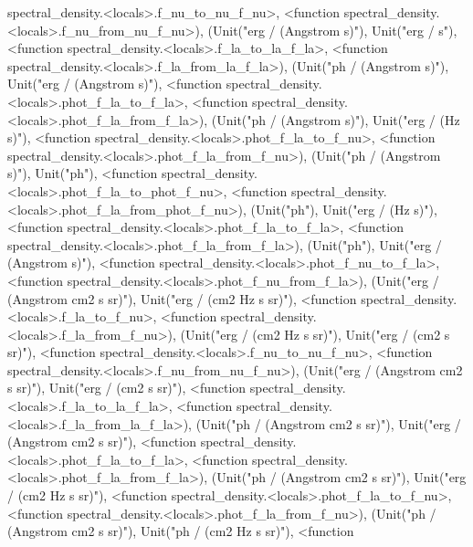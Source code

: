 \documentclass[letterpaper,10pt,english]{sphinxmanual}
\begin{document}
\begin{fulllineitems}
spectral\_density.\textless{}locals\textgreater{}.f\_nu\_to\_nu\_f\_nu\textgreater{}, \textless{}function spectral\_density.\textless{}locals\textgreater{}.f\_nu\_from\_nu\_f\_nu\textgreater{}), (Unit("erg / (Angstrom s)"), Unit("erg / s"), \textless{}function spectral\_density.\textless{}locals\textgreater{}.f\_la\_to\_la\_f\_la\textgreater{}, \textless{}function spectral\_density.\textless{}locals\textgreater{}.f\_la\_from\_la\_f\_la\textgreater{}), (Unit("ph / (Angstrom s)"), Unit("erg / (Angstrom s)"), \textless{}function spectral\_density.\textless{}locals\textgreater{}.phot\_f\_la\_to\_f\_la\textgreater{}, \textless{}function spectral\_density.\textless{}locals\textgreater{}.phot\_f\_la\_from\_f\_la\textgreater{}), (Unit("ph / (Angstrom s)"), Unit("erg / (Hz s)"), \textless{}function spectral\_density.\textless{}locals\textgreater{}.phot\_f\_la\_to\_f\_nu\textgreater{}, \textless{}function spectral\_density.\textless{}locals\textgreater{}.phot\_f\_la\_from\_f\_nu\textgreater{}), (Unit("ph / (Angstrom s)"), Unit("ph"), \textless{}function spectral\_density.\textless{}locals\textgreater{}.phot\_f\_la\_to\_phot\_f\_nu\textgreater{}, \textless{}function spectral\_density.\textless{}locals\textgreater{}.phot\_f\_la\_from\_phot\_f\_nu\textgreater{}), (Unit("ph"), Unit("erg / (Hz s)"), \textless{}function spectral\_density.\textless{}locals\textgreater{}.phot\_f\_la\_to\_f\_la\textgreater{}, \textless{}function spectral\_density.\textless{}locals\textgreater{}.phot\_f\_la\_from\_f\_la\textgreater{}), (Unit("ph"), Unit("erg / (Angstrom s)"), \textless{}function spectral\_density.\textless{}locals\textgreater{}.phot\_f\_nu\_to\_f\_la\textgreater{}, \textless{}function spectral\_density.\textless{}locals\textgreater{}.phot\_f\_nu\_from\_f\_la\textgreater{}), (Unit("erg / (Angstrom cm2 s sr)"), Unit("erg / (cm2 Hz s sr)"), \textless{}function spectral\_density.\textless{}locals\textgreater{}.f\_la\_to\_f\_nu\textgreater{}, \textless{}function spectral\_density.\textless{}locals\textgreater{}.f\_la\_from\_f\_nu\textgreater{}), (Unit("erg / (cm2 Hz s sr)"), Unit("erg / (cm2 s sr)"), \textless{}function spectral\_density.\textless{}locals\textgreater{}.f\_nu\_to\_nu\_f\_nu\textgreater{}, \textless{}function spectral\_density.\textless{}locals\textgreater{}.f\_nu\_from\_nu\_f\_nu\textgreater{}), (Unit("erg / (Angstrom cm2 s sr)"), Unit("erg / (cm2 s sr)"), \textless{}function spectral\_density.\textless{}locals\textgreater{}.f\_la\_to\_la\_f\_la\textgreater{}, \textless{}function spectral\_density.\textless{}locals\textgreater{}.f\_la\_from\_la\_f\_la\textgreater{}), (Unit("ph / (Angstrom cm2 s sr)"), Unit("erg / (Angstrom cm2 s sr)"), \textless{}function spectral\_density.\textless{}locals\textgreater{}.phot\_f\_la\_to\_f\_la\textgreater{}, \textless{}function spectral\_density.\textless{}locals\textgreater{}.phot\_f\_la\_from\_f\_la\textgreater{}), (Unit("ph / (Angstrom cm2 s sr)"), Unit("erg / (cm2 Hz s sr)"), \textless{}function spectral\_density.\textless{}locals\textgreater{}.phot\_f\_la\_to\_f\_nu\textgreater{}, \textless{}function spectral\_density.\textless{}locals\textgreater{}.phot\_f\_la\_from\_f\_nu\textgreater{}), (Unit("ph / (Angstrom cm2 s sr)"), Unit("ph / (cm2 Hz s sr)"), \textless{}function 
\end{fulllineitems}
\end{document}

